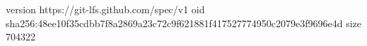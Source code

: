 version https://git-lfs.github.com/spec/v1
oid sha256:48ee10f35cdbb7f8a2869a23c72c9f621881f417527774950c2079e3f9696e4d
size 704322
